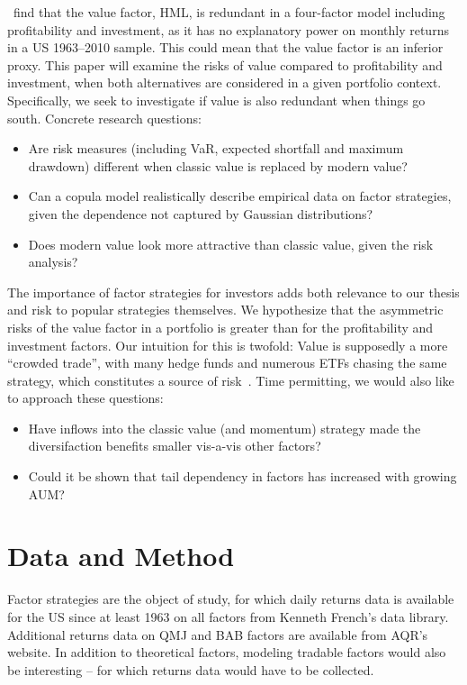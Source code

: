 \documentclass[a4paper,11pt]{article}
\begin{document}
\Textcite{FF2015}~find that the value factor, HML, is redundant in a four-factor model including profitability and investment, as it has no explanatory power on monthly returns in a US 1963--2010 sample. This could mean that the value factor is an inferior proxy. This paper will examine the risks of value compared to profitability and investment, when both alternatives are considered in a given portfolio context. Specifically, we seek to investigate if value is also redundant when things go south. Concrete research questions:
\begin{itemize}
  \item Are risk measures (including VaR, expected shortfall and maximum drawdown) different when classic value is replaced by modern value?
  \item Can a copula model realistically describe empirical data on factor strategies, given the dependence not captured by Gaussian distributions?
  \item Does modern value look more attractive than classic value, given the risk analysis?
\end{itemize}
The importance of factor strategies for investors adds both relevance to our thesis and risk to popular strategies themselves. We hypothesize that the asymmetric risks of the value factor in a portfolio is greater than for the profitability and investment factors. Our intuition for this is twofold: Value is supposedly a more ``crowded trade'', with many hedge funds and numerous ETFs chasing the same strategy, which constitutes a source of risk~\autocite{HongStein1999}. Time permitting, we would also like to approach these questions:
\begin{itemize}
  \item Have inflows into the classic value (and momentum) strategy made the diversifaction benefits smaller vis-a-vis other factors?
  \item Could it be shown that tail dependency in factors has increased with growing AUM?
\end{itemize}

\section{Data and Method}
Factor strategies are the object of study, for which daily returns data is available for the US since at least 1963 on all factors from Kenneth French's data library. Additional returns data on QMJ and BAB factors are available from AQR's website. In addition to theoretical factors, modeling tradable factors would also be interesting -- for which returns data would have to be collected.
\end{document}
